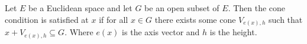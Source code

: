 \begin{definition}
\label{def:cone_condition}
    Let $E$ be a Euclidean space and let $G$ be an open subset of $E$. Then the cone condition is satisfied at $x$ if for all $x\in G$ there exists some cone $V_{e(x),h}$ such that $x+V_{e(x),h}\subseteq G$.
    Where $e(x)$ is the axis vector and $h$ is the height. 
\end{definition}